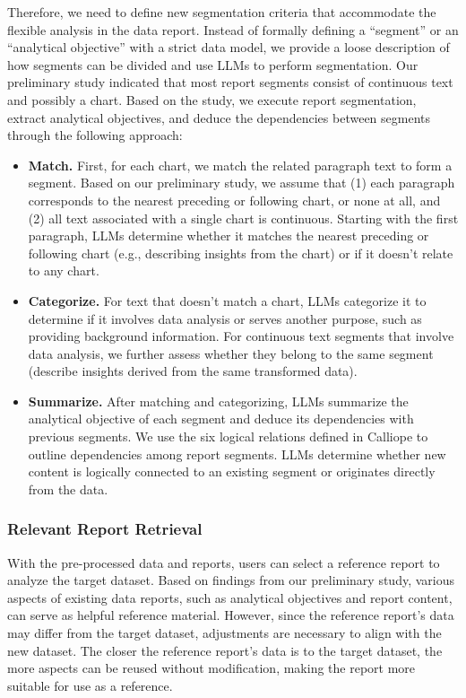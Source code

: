 Therefore, we need to define new segmentation criteria that accommodate the flexible analysis in the data report. 
Instead of formally defining a ``segment'' or an ``analytical objective'' with a strict data model, we provide a loose description of how segments can be divided and use LLMs to perform segmentation. 
Our preliminary study indicated that most report segments consist of continuous text and possibly a chart.
Based on the study, we execute report segmentation, extract analytical objectives, and deduce the dependencies between segments through the following approach: 
\begin{itemize}
    \item \textbf{Match. } 
    First, for each chart, we match the related paragraph text to form a segment. 
    Based on our preliminary study, we assume that (1) each paragraph corresponds to the nearest preceding or following chart, or none at all, and (2) all text associated with a single chart is continuous. 
    Starting with the first paragraph, LLMs determine whether it matches the nearest preceding or following chart (e.g., describing insights from the chart) or if it doesn't relate to any chart.
    
    \item \textbf{Categorize. } 
    For text that doesn't match a chart, LLMs categorize it to determine if it involves data analysis or serves another purpose, such as providing background information. 
    For continuous text segments that involve data analysis, we further assess whether they belong to the same segment (describe insights derived from the same transformed data). 
    
    \item \textbf{Summarize. } 
    After matching and categorizing, LLMs summarize the analytical objective of each segment and deduce its dependencies with previous segments. 
    We use the six logical relations defined in Calliope to outline dependencies among report segments. 
    LLMs determine whether new content is logically connected to an existing segment or originates directly from the data.
\end{itemize}


\subsubsection{Relevant Report Retrieval}
\label{subsubsec:report_retrieval}


With the pre-processed data and reports, users can select a reference report to analyze the target dataset. 
Based on findings from our preliminary study, various aspects of existing data reports, such as analytical objectives and report content, can serve as helpful reference material. 
However, since the reference report's data may differ from the target dataset, adjustments are necessary to align with the new dataset. 
The closer the reference report's data is to the target dataset, the more aspects can be reused without modification, making the report more suitable for use as a reference.



